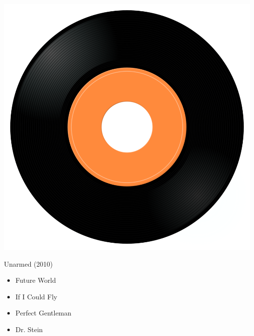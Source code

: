 \begin{minipage}[t]{0.25\textwidth}
\captionsetup{type=figure}
\includegraphics[width=\textwidth]{Images/cover.png}
\caption*{Unarmed (2010)}
\end{minipage}
\begin{minipage}[t]{0.25\textwidth}\vspace{0pt}
\begin{itemize}[nosep,leftmargin=1em,labelwidth=*,align=left]
	\setlength{\itemsep}{0pt}
	\item Future World 
	\item If I Could Fly
	\item Perfect Gentleman 
	\item Dr. Stein
\end{itemize}
\end{minipage}
